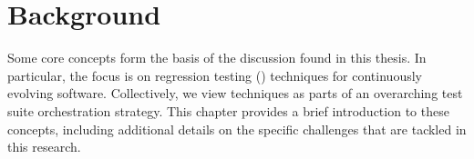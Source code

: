 \chapter{Background}\label{chap:background}

Some core concepts form the basis of the discussion found in this thesis.
In particular, the focus is on regression testing (\rt) techniques for continuously evolving software.
Collectively, we view \rt techniques as parts of an overarching test suite orchestration strategy.
This chapter provides a brief introduction to these concepts, including additional details on the specific \rt challenges that are tackled in this research.



%




